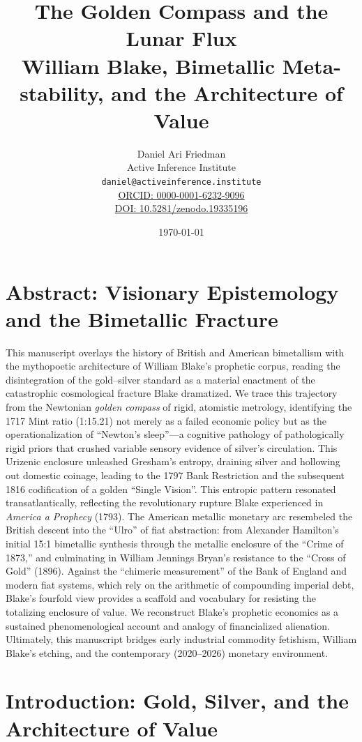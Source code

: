 \documentclass[
]{article}
\author{}
\date{}
\title{The Golden Compass and the Lunar Flux\\\normalsize William Blake, Bimetallic Meta-stability, and the Architecture of Value}
\author{Daniel Ari Friedman\\\footnotesize{Active Inference Institute}\\\footnotesize{\texttt{daniel@activeinference.institute}}\\\footnotesize{\href{https://orcid.org/0000-0001-6232-9096}{ORCID: 0000-0001-6232-9096}} \\ \footnotesize{\href{https://doi.org/10.5281/zenodo.19335196}{DOI: 10.5281/zenodo.19335196}}}
\date{\today}
\begin{document}
\maketitle
\thispagestyle{empty}
\tableofcontents
\newpage


\section{Abstract: Visionary Epistemology and the Bimetallic
Fracture}\label{abstract-visionary-epistemology-and-the-bimetallic-fracture}

This manuscript overlays the history of British and American bimetallism
with the mythopoetic architecture of William Blake's prophetic corpus,
reading the disintegration of the gold--silver standard as a material
enactment of the catastrophic cosmological fracture Blake dramatized. We
trace this trajectory from the Newtonian \emph{golden compass} of rigid,
atomistic metrology, identifying the 1717 Mint ratio (1:15.21) not
merely as a failed economic policy but as the operationalization of
``Newton's sleep''---a cognitive pathology of pathologically rigid
priors that crushed variable sensory evidence of silver's circulation.
This Urizenic enclosure unleashed Gresham's entropy, draining silver and
hollowing out domestic coinage, leading to the 1797 Bank Restriction and
the subsequent 1816 codification of a golden ``Single Vision''. This
entropic pattern resonated transatlantically, reflecting the
revolutionary rupture Blake experienced in \emph{America a Prophecy}
(1793). The American metallic monetary arc resembeled the British
descent into the ``Ulro'' of fiat abstraction: from Alexander Hamilton's
initial 15:1 bimetallic synthesis through the metallic enclosure of the
``Crime of 1873,'' and culminating in William Jennings Bryan's
resistance to the ``Cross of Gold'' (1896). Against the ``chimeric
measurement'' of the Bank of England and modern fiat systems, which rely
on the arithmetic of compounding imperial debt, Blake's fourfold view
provides a scaffold and vocabulary for resisting the totalizing
enclosure of value. We reconstruct Blake's prophetic economics as a
sustained phenomenological account and analogy of financialized
alienation. Ultimately, this manuscript bridges early industrial
commodity fetishism, William Blake's etching, and the contemporary
(2020--2026) monetary environment.

\newpage

\section{Introduction: Gold, Silver, and the Architecture of
Value}\label{introduction-gold-silver-and-the-architecture-of-value}
\end{document}
